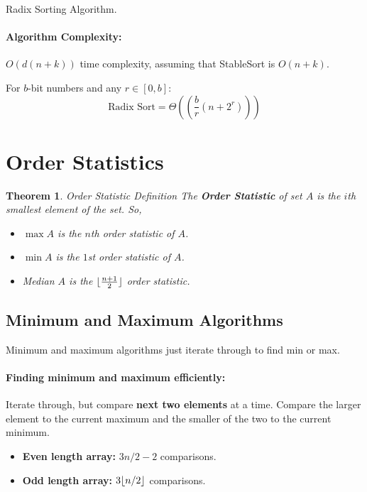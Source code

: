 \documentclass[a4paper,12pt]{report}
\newtheorem{theorem}{Theorem}
\DeclarePairedDelimiter{\floor}{\lfloor}{\rfloor}
\begin{document}
\begin{algorithm}[H]
\SetAlgoLined
{}
	\BlankLine
	\BlankLine

	\caption{Radix Sorting Algorithm.}
\end{algorithm}

\paragraph{Algorithm Complexity: } $O(d(n+k))$ time complexity, assuming that StableSort is $O(n+k)$.


For $b$-bit numbers and any $r\in [0,b]$: 
$$\text{Radix Sort} = \Theta((\frac{b}{r} (n+2^r)))$$


\section{Order Statistics}

\begin{theorem}{Order Statistic Definition}
The \textbf{Order Statistic} of set $A$ is the $i$th smallest element of the set. So,
\begin{itemize}
\item $\max A$ is the $n$th order statistic of $A$.
\item $\min A$ is the $1$st order statistic of $A$.
\item Median $A$ is the $\floor{\frac{n+1}{2}}$ order statistic. 
\end{itemize}
\end{theorem}


\subsection{Minimum and Maximum Algorithms}

Minimum and maximum algorithms just iterate through to find min or max. 

\paragraph{Finding minimum and maximum efficiently: } Iterate through, but compare \textbf{next two elements} at a time. Compare the larger element to the current maximum and the smaller of the two to the current minimum.
\begin{itemize}
\item \textbf{Even length array: } $3n/2-2$ comparisons.
\item \textbf{Odd length array: } $3\floor{n/2}$ comparisons.
\end{itemize}
\end{document}
